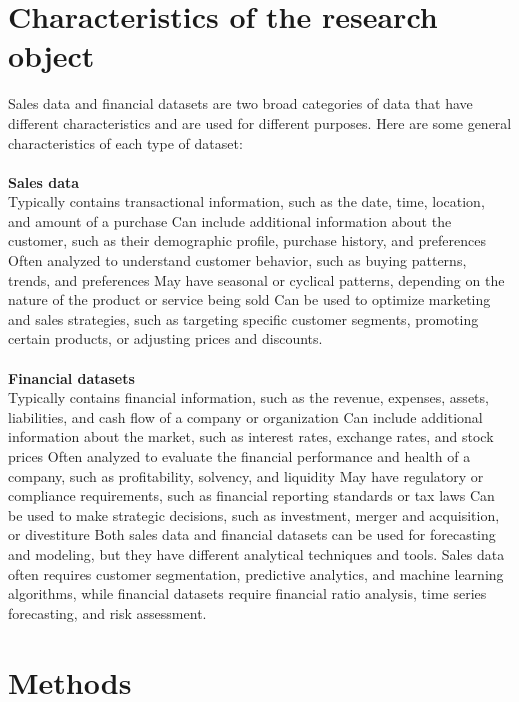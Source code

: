 \section{Characteristics of the research object} \label{subsec:research_object}
Sales data and financial datasets are two broad categories of data that have different characteristics and are used for different purposes.
Here are some general characteristics of each type of dataset:\\
\\
\textbf{Sales data}\\
Typically contains transactional information, such as the date, time, location, and amount of a purchase
Can include additional information about the customer, such as their demographic profile, purchase history, and preferences
Often analyzed to understand customer behavior, such as buying patterns, trends, and preferences
May have seasonal or cyclical patterns, depending on the nature of the product or service being sold
Can be used to optimize marketing and sales strategies, such as targeting specific customer segments, promoting certain products, or adjusting
prices and discounts.\\
\\
\textbf{Financial datasets}\\
Typically contains financial information, such as the revenue, expenses, assets, liabilities, and cash flow of a company or organization
Can include additional information about the market, such as interest rates, exchange rates, and stock prices
Often analyzed to evaluate the financial performance and health of a company, such as profitability, solvency, and liquidity
May have regulatory or compliance requirements, such as financial reporting standards or tax laws
Can be used to make strategic decisions, such as investment, merger and acquisition, or divestiture
Both sales data and financial datasets can be used for forecasting and modeling, but they have different analytical
techniques and tools. Sales data often requires customer segmentation, predictive analytics, and machine learning algorithms,
while financial datasets require financial ratio analysis, time series forecasting, and risk assessment.
\section{Methods} \label{subsec:methods}
